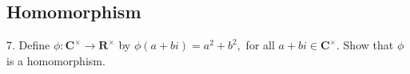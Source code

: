 \subsection{Homomorphism}
\begin{mdframed}[style=darkQuesion]
  7. Define $\phi: \mathbf{C}^{\times} \rightarrow \mathbf{R}^{\times}$ by $\phi(a+b i)=a^{2}+b^{2},$ for all $a+b i \in \mathbf{C}^{\times} .$ Show that $\phi$
is a homomorphism.
\end{mdframed}
\begin{mdframed}[style=darkAnswer,frametitle={Joe Starr}]
\end{mdframed}
\newpage
